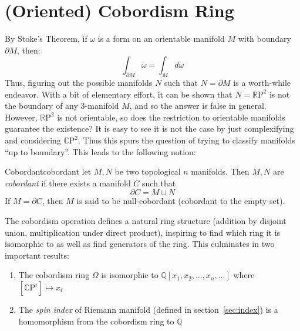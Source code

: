 \documentclass{ut-thesis}
\newcommand{\Q}{{\mathbb{Q}}}
\newcommand{\CP}{{\mathbb{C}\mathrm{P}}}
\newcommand{\RP}{{\mathbb{R}\mathrm{P}}}
\newcommand{\dcup}{\sqcup}
\begin{document}
%

\section{(Oriented) Cobordism Ring}\label{sec:pontryaginNum}

By Stoke's Theorem, if $\omega$ is a form on an orientable manifold $M$ with boundary $\partial M$, then:
\[
  \int_{\partial M} \omega = \int_M d\omega
\]
Thus, figuring out the possible manifolds $N$ such that $N = \partial M$ is a worth-while endeavor. With a bit
of elementary effort, it can be shown that $N = \RP^2$ is not the boundary of any $3$-manifold $M$, and so the
answer is false in general. However, $\RP^2$ is not orientable, so does the restriction to orientable
manifolds guarantee the existence? It is easy to see it is not the case by just complexifying and considering
$\CP^2$. Thus this spurs the question of trying to classify manifolds ``up to boundary''. This leads to the
following notion:

\begin{defn}{Cobordant}{cobordant}
  let $M,N$ be two topological $n$ manifolds. Then $M,N$ are \emph{cobordant} if there exists a manifold $C$
  such that
  \[
    \partial C = M \dcup N
  \]
  If $M = \partial C$, then $M$ is said to be null-cobordant (cobordant to the empty set).
\end{defn}

The cobordism operation defines a natural ring structure (addition by disjoint union, multiplication under direct
product), inspiring to find which ring it is isomorphic to as
well as find generators of the ring. This culminates in two important results:
\begin{enumerate}
  \item The cobordism ring $\Omega$ is isomorphic to $\Q[x_1, x_2, ..., x_n, ...]$ where $[\CP^i] \mapsto x_i$
  \item The \emph{spin index} of Riemann manifold (defined in section~\ref{sec:index}) is a homomorphism from
    the cobordism ring to $\Q$
\end{enumerate}
\end{document}

